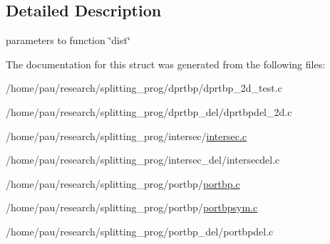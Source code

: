 \subsection{Detailed Description}
parameters to function \char`\"{}dist\char`\"{} 

The documentation for this struct was generated from the following files:\begin{DoxyCompactItemize}
\item 
/home/pau/research/splitting\_\-prog/dprtbp/dprtbp\_\-2d\_\-test.c\item 
/home/pau/research/splitting\_\-prog/dprtbp\_\-del/dprtbpdel\_\-2d.c\item 
/home/pau/research/splitting\_\-prog/intersec/\hyperlink{intersec_8c}{intersec.c}\item 
/home/pau/research/splitting\_\-prog/intersec\_\-del/intersecdel.c\item 
/home/pau/research/splitting\_\-prog/portbp/\hyperlink{portbp_8c}{portbp.c}\item 
/home/pau/research/splitting\_\-prog/portbp/\hyperlink{portbpsym_8c}{portbpsym.c}\item 
/home/pau/research/splitting\_\-prog/portbp\_\-del/portbpdel.c\end{DoxyCompactItemize}
